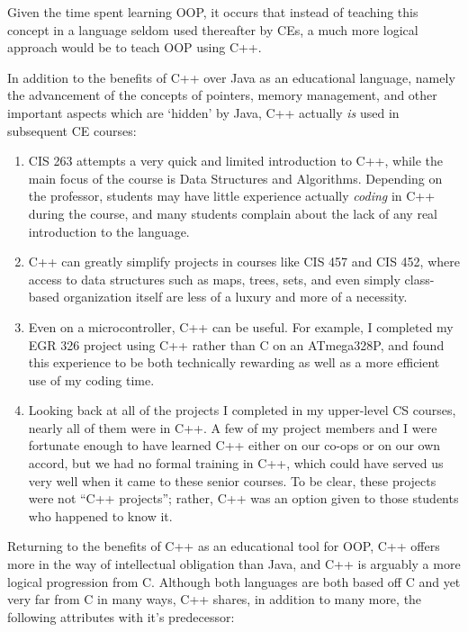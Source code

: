 \documentclass[12pt]{article}
\numberwithin{figure}{section}
\numberwithin{equation}{section}
\begin{document}
{\bigskip

Given the time spent learning OOP, it occurs that instead of teaching
this concept in a language seldom used thereafter by CEs, a much more
logical approach would be to teach OOP using C++.

\bigskip

In addition to the benefits of C++ over Java as an educational language,
namely the advancement of the concepts of pointers, memory management,
and other important aspects which are `hidden' by Java, C++ actually
\emph{is} used in subsequent CE courses:

\begin{enumerate}
\item   CIS 263 attempts a very quick and limited introduction to C++, while
        the main focus of the course is Data Structures and Algorithms.
        Depending on the professor, students may have little experience
        actually \emph{coding} in C++ during the course, and many students
        complain about the lack of any real introduction to the language.
\item   C++ can greatly simplify projects in courses like CIS 457 and CIS 452,
        where access to data structures such as maps, trees, sets, and even
        simply class-based organization itself are less of a luxury and more
        of a necessity.
\item   Even on a microcontroller, C++ can be useful. For example, I completed
        my EGR 326 project using C++ rather than C on an ATmega328P, and found
        this experience to be both technically rewarding as well as a more
        efficient use of my coding time.
\item   Looking back at all of the projects I completed in my upper-level CS courses, nearly all of them were in C++. A few of my project members and I were fortunate enough to have learned C++ either on our co-ops or on our own accord, but we had no formal training in C++, which could have served us very well when it came to these senior courses. To be clear, these projects were not ``C++ projects''; rather, C++ was an option given to those students who happened to know it.
\end{enumerate}

Returning to the benefits of C++ as an educational tool for OOP, C++
offers more in the way of intellectual obligation than Java, and C++ is
arguably a more logical progression from C. Although both languages are
both based off C and yet very far from C in many ways, C++ shares, in
addition to many more, the following attributes with it's predecessor:

}
\end{document}
